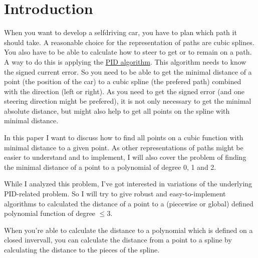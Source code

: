 \chapter*{Introduction}
When you want to develop a selfdriving car, you have to plan which path 
it should take. A reasonable choice for the representation of
paths are cubic splines. You also have to be able to calculate
how to steer to get or to remain on a path. A way to do this
is applying the \href{https://en.wikipedia.org/wiki/PID_algorithm}{PID algorithm}.
This algorithm needs to know the signed current error. So you need to 
be able to get the minimal distance of a point (the position of the car)
to a cubic spline (the prefered path)
combined with the direction (left or right).
As you need to get the signed error (and one steering direction might
be prefered), it is not only necessary to
get the minimal absolute distance, but might also help to get all points
on the spline with minimal distance.

In this paper I want to discuss how to find all points on a cubic 
function with minimal distance to a given point.
As other representations of paths might be easier to understand and
to implement, I will also cover the problem of finding the minimal
distance of a point to a polynomial of degree 0, 1 and 2.

While I analyzed this problem, I've got interested in variations
of the underlying PID-related problem. So I will try to give
robust and easy-to-implement algorithms to calculated the distance
of a point to a (piecewise or global) defined polynomial function
of degree $\leq 3$.

When you're able to calculate the distance to a polynomial which is
defined on a closed invervall, you can calculate the distance from
a point to a spline by calculating the distance to the pieces of the
spline.
